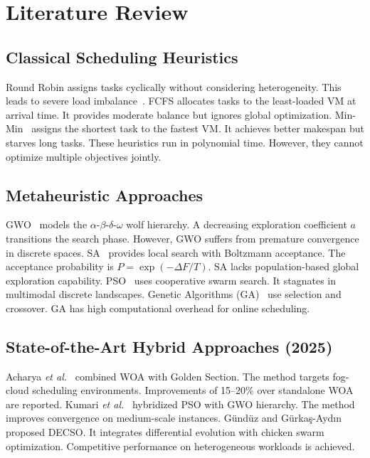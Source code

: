 \documentclass[conference]{IEEEtran}
\begin{document}
\section{Literature Review}

\subsection{Classical Scheduling Heuristics}
Round Robin assigns tasks cyclically without considering heterogeneity.
This leads to severe load imbalance~\cite{masdari2016overview}.
FCFS allocates tasks to the least-loaded VM at arrival time.
It provides moderate balance but ignores global optimization.
Min-Min~\cite{braun2001comparison} assigns the shortest task to the fastest VM.
It achieves better makespan but starves long tasks.
These heuristics run in polynomial time.
However, they cannot optimize multiple objectives jointly.

\subsection{Metaheuristic Approaches}
GWO~\cite{mirjalili2014grey} models the $\alpha$-$\beta$-$\delta$-$\omega$ wolf hierarchy.
A decreasing exploration coefficient $a$ transitions the search phase.
However, GWO suffers from premature convergence in discrete spaces.
SA~\cite{kirkpatrick1983optimization} provides local search with Boltzmann acceptance.
The acceptance probability is $P = \exp(-\Delta F / T)$.
SA lacks population-based global exploration capability.
PSO~\cite{kennedy1995particle} uses cooperative swarm search.
It stagnates in multimodal discrete landscapes.
Genetic Algorithms (GA)~\cite{holland1975adaptation} use selection and crossover.
GA has high computational overhead for online scheduling.

\subsection{State-of-the-Art Hybrid Approaches (2025)}
Acharya \textit{et al.}~\cite{acharya2025hybrid} combined WOA with Golden Section.
The method targets fog-cloud scheduling environments.
Improvements of 15--20\% over standalone WOA are reported.
Kumari \textit{et al.}~\cite{kumari2025hybrid} hybridized PSO with GWO hierarchy.
The method improves convergence on medium-scale instances.
G\"{u}nd\"{u}z and G\"{u}rka\c{s}-Ayd\i n~\cite{gunduz2025hybrid} proposed DECSO.
It integrates differential evolution with chicken swarm optimization.
Competitive performance on heterogeneous workloads is achieved.
\end{document}
